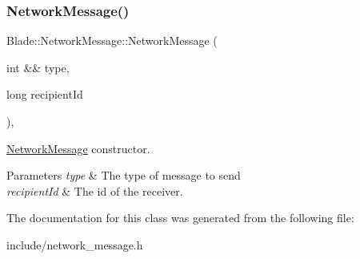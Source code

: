 \subsubsection{\texorpdfstring{Network\+Message()}{NetworkMessage()}}
{\footnotesize\ttfamily Blade\+::\+Network\+Message\+::\+Network\+Message (\begin{DoxyParamCaption}\item[{int \&\&}]{type,  }\item[{long}]{recipient\+Id }\end{DoxyParamCaption})\hspace{0.3cm}{\ttfamily [inline]}, {\ttfamily [explicit]}}



\hyperlink{class_blade_1_1_network_message}{Network\+Message} constructor. 


\begin{DoxyParams}{Parameters}
{\em type} & The type of message to send \\
\hline
{\em recipient\+Id} & The id of the receiver. \\
\hline
\end{DoxyParams}


The documentation for this class was generated from the following file\+:\begin{DoxyCompactItemize}
\item 
include/network\+\_\+message.\+h\end{DoxyCompactItemize}
